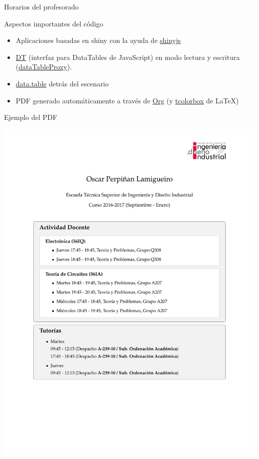 \documentclass[spanish, xcolor={usenames,svgnames,dvipsnames}]{beamer}
\begin{document}
\begin{frame}[label={sec:orgcb0d0e8}]{Horarios del profesorado}
\begin{block}{Aspectos importantes del código}
\begin{itemize}
\item Aplicaciones basadas en shiny con la ayuda de \href{https://daattali.com/shiny/shinyjs-demo/}{shinyjs}
\item \href{https://github.com/Rdatatable/data.table/wiki}{DT} (interfaz para DataTables de JavaScript) en modo lectura y escritura (\href{https://yihui.shinyapps.io/DT-proxy/}{dataTableProxy}).
\item \href{https://github.com/Rdatatable/data.table/wiki}{data.table} detrás del escenario
\item PDF generado automáticamente a través de \href{http://orgmode.org/}{Org} (y \href{https://www.ctan.org/pkg/tcolorbox}{tcolorbox} de \LaTeX{})
\end{itemize}
\end{block}
\end{frame}

\begin{frame}[label={sec:orgca2ad73}]{Ejemplo del PDF}
\begin{center}
\includegraphics[width=.9\linewidth]{images/tutorias_OPL.pdf}
\end{center}
\end{frame}
\end{document}
